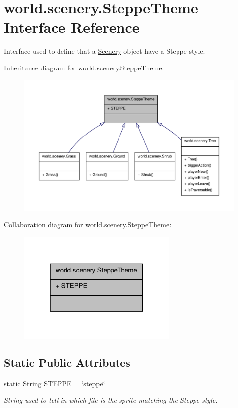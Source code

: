 \hypertarget{a00027}{\section{world.\-scenery.\-Steppe\-Theme Interface Reference}
\label{a00027}
}


Interface used to define that a \hyperlink{a00024}{Scenery} object have a Steppe style.  




Inheritance diagram for world.\-scenery.\-Steppe\-Theme\-:
\nopagebreak
\begin{figure}[H]
\begin{center}
\leavevmode
\includegraphics[width=350pt]{a00185}
\end{center}
\end{figure}


Collaboration diagram for world.\-scenery.\-Steppe\-Theme\-:
\nopagebreak
\begin{figure}[H]
\begin{center}
\leavevmode
\includegraphics[width=220pt]{a00186}
\end{center}
\end{figure}
\subsection*{Static Public Attributes}
\begin{DoxyCompactItemize}
\item 
static String \hyperlink{a00027_a03bdfdc54a3a5d52694b77342ec34e3e}{S\-T\-E\-P\-P\-E} = \char`\"{}steppe\char`\"{}
\begin{DoxyCompactList}\small\item\em String used to tell in which file is the sprite matching the Steppe style. \end{DoxyCompactList}\end{DoxyCompactItemize}



